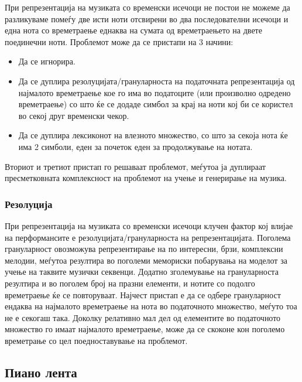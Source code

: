 При репрезентација на музиката со временски исечоци не постои не можеме да разликуваме помеѓу две исти ноти отсвирени во два последователни исечоци и една нота со времетраење еднаква на сумата од времетраењето на двете поединечни ноти. Проблемот може да се пристапи на 3 начини:
\begin{itemize}
    \item Да се игнорира.
    \item Да се дуплира резолуцијата/грануларноста на податочната репрезентација од најмалото времетраење кое го има во податоците (или произволно одредено времетраење) со што ќе се додаде симбол за крај на ноти кој би се користел во секој друг временски чекор.
    \item Да се дуплира лексиконот на влезното множество, со што за секоја нота ќе има 2 симболи, еден за почеток еден за продолжување на нотата.
\end{itemize}
Вториот и третиот пристап го решаваат проблемот, меѓутоа ја дуплираат пресметковната комплексност на проблемот на учење и генерирање на музика.

\subsubsection{Резолуција}

При репрезентација на музиката со временски исечоци клучен фактор кој влијае на перформансите е резолуцијата/грануларноста на репрезентацијата. Поголема грануларност овозможува репрезентирање на по интересни, брзи, комплексни мелодии, меѓутоа резултира во поголеми мемориски побарувања на моделот за учење на таквите музички секвенци. Додатно зголемување на грануларноста резултира и во поголем број на празни елементи, и нотите со подолго времетраење ќе се повторуваат. Најчест пристап е да се одбере грануларност ендаква на најмалото времетраење на нота во податочното множество, меѓуто тоа не е секогаш така. Доколку релативно мал дел од елементите во податочното множество го имаат најмалото времетраење, може да се скоконе кон поголемо времетрање со цел поедноставување на проблемот.

\subsection{Пиано лента}

